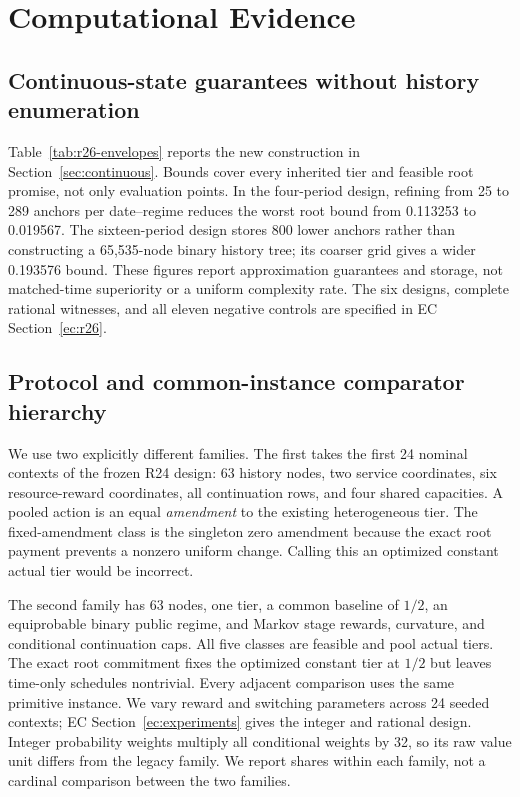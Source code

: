 \documentclass[11pt,letterpaper]{article}
\theoremstyle{definition}\newtheorem{assumption}[theorem]{Assumption}
\begin{document}
\section{Computational Evidence}\label{sec:evidence}
\subsection{Continuous-state guarantees without history enumeration}
Table~\ref{tab:r26-envelopes} reports the new construction in Section~\ref{sec:continuous}. Bounds cover every inherited tier and feasible root promise, not only evaluation points. In the four-period design, refining from 25 to 289 anchors per date--regime reduces the worst root bound from 0.113253 to 0.019567. The sixteen-period design stores 800 lower anchors rather than constructing a 65,535-node binary history tree; its coarser grid gives a wider 0.193576 bound. These figures report approximation guarantees and storage, not matched-time superiority or a uniform complexity rate. The six designs, complete rational witnesses, and all eleven negative controls are specified in EC Section~\ref{ec:r26}.


\subsection{Protocol and common-instance comparator hierarchy}
We use two explicitly different families. The first takes the first 24 nominal contexts of the frozen R24 design: 63 history nodes, two service coordinates, six resource-reward coordinates, all continuation rows, and four shared capacities. A pooled action is an equal \emph{amendment} to the existing heterogeneous tier. The fixed-amendment class is the singleton zero amendment because the exact root payment prevents a nonzero uniform change. Calling this an optimized constant actual tier would be incorrect.

The second family has 63 nodes, one tier, a common baseline of $1/2$, an equiprobable binary public regime, and Markov stage rewards, curvature, and conditional continuation caps. All five classes are feasible and pool actual tiers. The exact root commitment fixes the optimized constant tier at $1/2$ but leaves time-only schedules nontrivial. Every adjacent comparison uses the same primitive instance. We vary reward and switching parameters across 24 seeded contexts; EC Section~\ref{ec:experiments} gives the integer and rational design. Integer probability weights multiply all conditional weights by 32, so its raw value unit differs from the legacy family. We report shares within each family, not a cardinal comparison between the two families.
\end{document}
